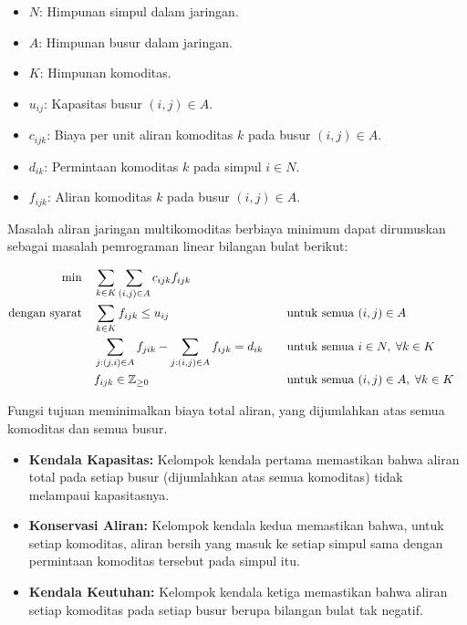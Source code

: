 \begin{itemize}
\item \( N \): Himpunan simpul dalam jaringan.
\item \( A \): Himpunan busur dalam jaringan.
\item \( K \): Himpunan komoditas.
\end{itemize}
%
\begin{itemize}
\item \( u_{ij} \): Kapasitas busur \( (i, j) \in A \).
\item \( c_{ijk} \): Biaya per unit aliran komoditas \( k \) pada busur \( (i, j) \in A \).
\item \( d_{ik} \): Permintaan komoditas \( k \) pada simpul \( i \in N \).
\end{itemize}
%
\begin{itemize}
\item \( f_{ijk} \): Aliran komoditas \( k \) pada busur \( (i, j) \in A \).
\end{itemize}
%
Masalah aliran jaringan multikomoditas berbiaya minimum dapat dirumuskan sebagai masalah pemrograman linear bilangan bulat berikut:

\begin{align*}
\min \quad & \sum_{k \in K} \sum_{(i, j) \in A} c_{ijk} f_{ijk} \\
\mbox{dengan syarat}\quad        & \sum_{k \in K} f_{ijk} \leq u_{ij} &&\quad \mbox{untuk semua } (i, j) \in A \\
& \sum_{j:(j, i) \in A} f_{jik} - \sum_{j:(i, j) \in A} f_{ijk} = d_{ik} &&\quad \mbox{untuk semua } i \in N, \; \forall k \in K \\
& f_{ijk} \in \mathbb{Z}_{\geq 0} &&\quad \mbox{untuk semua } (i, j) \in A, \; \forall k \in K
\end{align*}

Fungsi tujuan meminimalkan biaya total aliran, yang dijumlahkan atas semua komoditas dan semua busur.

\begin{itemize}
\item \textbf{Kendala Kapasitas:} Kelompok kendala pertama memastikan bahwa aliran total pada setiap busur (dijumlahkan atas semua komoditas) tidak melampaui kapasitasnya.
\item \textbf{Konservasi Aliran:} Kelompok kendala kedua memastikan bahwa, untuk setiap komoditas, aliran bersih yang masuk ke setiap simpul sama dengan permintaan komoditas tersebut pada simpul itu.
\item \textbf{Kendala Keutuhan:} Kelompok kendala ketiga memastikan bahwa aliran setiap komoditas pada setiap busur berupa bilangan bulat tak negatif.
\end{itemize}


